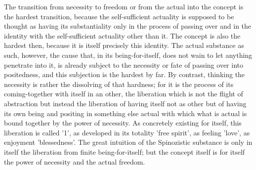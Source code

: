     The transition from necessity to freedom or
    from the actual into the concept is the hardest transition,
    because the self-sufficient actuality is supposed to be thought
    as having its substantiality only in the process of passing over and
    in the identity with the self-sufficient actuality other than it.
    The concept is also the hardest then, because
    it is itself precisely this identity.
    The actual substance as such, however,
    the cause that, in its being-for-itself,
    does not wain to let anything penetrate into it,
    is already subject to the necessity or fate
    of passing over into positedness,
    and this subjection is the hardest by far.
    By contrast, thinking the necessity is
    rather the dissolving of that hardness;
    for it is the process of
    its coming-together with itself in an other,
    the liberation which is not the flight of abstraction
    but instead the liberation of having itself
    not as other but of having its own being and positing
    in something else actual with which what is actual is
    bound together by the power of necessity.
    As concretely existing for itself,
    this liberation is called '1',
    as developed in its totality 'free spirit',
    as feeling 'love', as enjoyment 'blessedness'.
    The great intuition of the Spinozistic substance is
    only in itself the liberation from finite being-for-itself;
    but the concept itself is for itself
    the power of necessity and the actual freedom.
